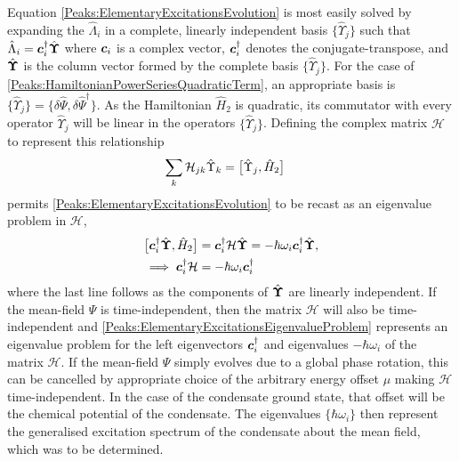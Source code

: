 Equation \eqref{Peaks:ElementaryExcitationsEvolution} is most easily solved by expanding the $\hat{\Lambda}_i$ in a complete, linearly independent basis $\{\hat{\Upsilon}_j\}$ such that $\hat{\Lambda}_i = \bm{c}_i^\dagger \hat{\bm{\Upsilon}}$ where $\bm{c}_i$ is a complex vector, $\bm{c}_i^\dagger$ denotes the conjugate-transpose, and $\hat{\bm{\Upsilon}}$ is the column vector formed by the complete basis $\{\hat{\Upsilon}_j\}$. For the case of \eqref{Peaks:HamiltonianPowerSeriesQuadraticTerm}, an appropriate basis is $\{\hat{\Upsilon}_j\} = \{\delta\hat{\Psi}, \delta\hat{\Psi}^\dagger\}$. As the Hamiltonian $\hat{H}_2$ is quadratic, its commutator with every operator $\hat{\Upsilon}_j$ will be linear in the operators $\{\hat{\Upsilon}_j\}$. Defining the complex matrix $\mathcal{H}$ to represent this relationship
\begin{align}
    \label{Peaks:ScriptHRelationshipToHamiltonian}
    \sum_k \mathcal{H}_{jk} \hat{\Upsilon}_k &= \comm{\hat{\Upsilon}_j, \hat{H}_2}
\end{align}
permits \eqref{Peaks:ElementaryExcitationsEvolution} to be recast as an eigenvalue problem in $\mathcal{H}$,
\begin{align}
    \comm{\vect{c}_i^\dagger \hat{\vect{\Upsilon}}, \hat{H}_2} &= \vect{c}_i^\dagger \mathcal{H} \hat{\vect{\Upsilon}} = - \hbar \omega_i \vect{c}_i^\dagger \hat{\vect{\Upsilon}}, \label{Peaks:ElementaryExcitationsEigenvalueProblemWithOperators}\\
    \implies \vect{c}_i^\dagger \mathcal{H} &= - \hbar \omega_i \vect{c}_i^\dagger \label{Peaks:ElementaryExcitationsEigenvalueProblem}
\end{align}
where the last line follows as the components of $\hat{\bm{\Upsilon}}$ are linearly independent. If the mean-field $\Psi$ is time-independent, then the matrix $\mathcal{H}$ will also be time-independent and \eqref{Peaks:ElementaryExcitationsEigenvalueProblem} represents an eigenvalue problem for the left eigenvectors $\bm{c}_i^\dagger$ and eigenvalues $-\hbar \omega_i$ of the matrix $\mathcal{H}$. If the mean-field $\Psi$ simply evolves due to a global phase rotation, this can be cancelled by appropriate choice of the arbitrary energy offset $\mu$ making $\mathcal{H}$ time-independent.  In the case of the condensate ground state, that offset will be the chemical potential of the condensate. The eigenvalues $\{\hbar \omega_i\}$ then represent the generalised excitation spectrum of the condensate about the mean field, which was to be determined. 

